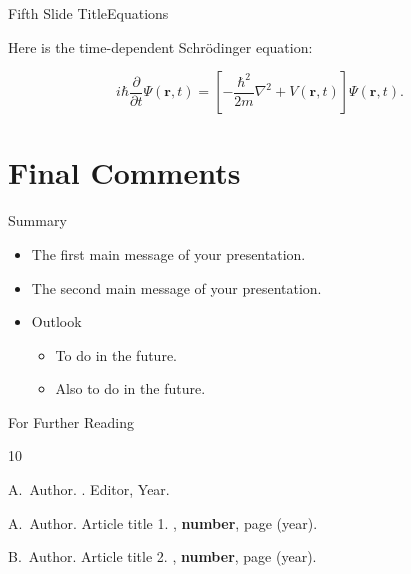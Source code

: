\documentclass[16pt]{beamer}
\begin{document}
\begin{frame}{Fifth Slide Title}{Equations}

Here is the time-dependent Schr\"{o}dinger equation:

\begin{equation}
    i \hbar \frac{\partial }{\partial t} \Psi ( \mathbf{r}, t) = 
    \left[ - \frac{\hbar^2 }{2 m} \nabla^2 +V ( \mathbf{r}, t)  \right] \Psi ( \mathbf{r}, t).
\end{equation}

\end{frame}

\section{Final Comments}

\begin{frame}{Summary}
  \begin{itemize}
  \item
    The \alert{first main message} of your presentation.
  \item
    The \alert{second main message} of your presentation.
  \end{itemize}
  
\vspace{1cm}

  \begin{itemize}
  \item
    Outlook
    \begin{itemize}
    \item
      To do in the future.
    \item
      Also to do in the future.
    \end{itemize}
  \end{itemize}
\end{frame}


\begin{frame}{For Further Reading}
    
  \begin{thebibliography}{10}
    
  \beamertemplatebookbibitems

    A.~Author.
    .
    \newblock Editor, Year.
 
  \beamertemplatearticlebibitems

    A.~Author.
    \newblock Article title 1.
    , \textbf{number}, page (year).
    
    B.~Author.
    \newblock Article title 2.
    , \textbf{number}, page (year).
    
  \end{thebibliography}
\end{frame}
\end{document}
